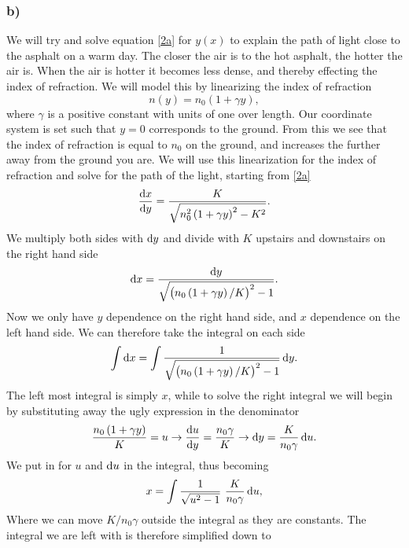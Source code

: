 \documentclass[12pt,twoside]{article}
\begin{document}
\subsubsection*{b)}
We will try and solve equation \eqref{2a} for $y(x)$ to explain the path of light close to the asphalt on a warm day. The closer the air is to the hot asphalt, the hotter the air is. When the air is hotter it becomes less dense, and thereby effecting the index of refraction. We will model this by linearizing the index of refraction
\begin{equation}
  n\left(y\right) = n_0\left(1+\gamma y\right),
\end{equation}
where $\gamma$ is a positive constant with units of one over length. Our coordinate system is set such that $y=0$ corresponds to the ground. From this we see that the index of refraction is equal to $n_0$ on the ground, and increases the further away from the ground you are. We will use this linearization for the index of refraction and solve for the path of the light, starting from \eqref{2a}
\begin{equation}
   \frac{\dif x}{\dif y} = \frac{K}{\sqrt{n_0^2\left(1+\gamma y\right)^2-K^2}}.
\end{equation}
We multiply both sides with $\dif y$ and divide with $K$ upstairs and downstairs on the right hand side
\begin{equation}
   \dif x = \frac{\dif y}{\sqrt{\left(n_0\left(1+\gamma y\right)/K\right)^2-1}}.
\end{equation}
Now we only have $y$ dependence on the right hand side, and $x$ dependence on the left hand side. We can therefore take the integral on each side
\begin{equation}
   \int \dif x = \int \frac{1}{\sqrt{\left(n_0\left(1+\gamma y\right)/K\right)^2-1}} \dif y.
\end{equation}
The left most integral is simply $x$, while to solve the right integral we will begin by substituting away the ugly expression in the denominator
\begin{equation}
  \frac{n_0\left(1+\gamma y\right)}{K} = u \rightarrow \frac{\dif u}{\dif y} = \frac{n_0\gamma}{K} \rightarrow \dif y = \frac{K}{n_0\gamma} \dif u. \label{u}
\end{equation}
We put in for $u$ and $\dif u$ in the integral, thus becoming
\begin{equation}
   x = \int \frac{1}{\sqrt{u^2-1}} \,\,\frac{K}{n_0\gamma} \dif u,
\end{equation}
Where we can move $K/n_0\gamma$ outside the integral as they are constants. The integral we are left with is therefore simplified down to
\end{document}
